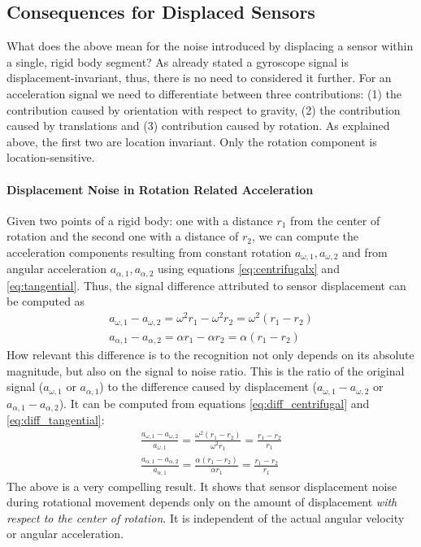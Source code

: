 \subsection{Consequences for Displaced Sensors}
What does the above mean for the noise introduced by displacing a
sensor within a single, rigid body segment?
As already stated a gyroscope signal is displacement-invariant, thus, there is no
need to considered it further. 
For an acceleration signal we need to differentiate between three
contributions: (1) the contribution caused by orientation with respect
to gravity, (2) the contribution caused by translations and  (3)
contribution caused by rotation. As explained above, the first two are
location invariant. Only the rotation component is location-sensitive. 

\paragraph{Displacement Noise in Rotation Related Acceleration}
Given two points of a rigid body: one with a distance $r_1$
from the center of rotation and the second one with a distance of
$r_2$, we can compute the  acceleration components
resulting from constant rotation $a_{\omega,1},a_{\omega,2}$ and from
angular acceleration $a_{\alpha,1},a_{\alpha,2}$ using equations
\ref{eq:centrifugalx} and \ref{eq:tangential}. 
Thus, the signal difference attributed to sensor displacement can be
computed as
\begin{eqnarray}
\label{eq:diff_centrifugal}
a_{\omega,1}-a_{\omega,2}=\omega^2r_1-\omega^2 r_2=\omega^2(r_1-r_2)
\\
\label{eq:diff_tangential}
a_{\alpha,1}-a_{\alpha,2}=\alpha r_1-\alpha  r_2=\alpha(r_1-r_2)
\end{eqnarray} 
How relevant this difference is to the recognition not only depends on its
absolute  magnitude, but also on the signal to noise ratio. This is
the ratio of the original signal ($a_{\omega,1}$ or
$a_{\alpha,1}$) to the difference caused by displacement
($a_{\omega,1}-a_{\omega,2}$ or $a_{\alpha,1}-a_{\alpha,2}$).  It can
be computed from equations \ref{eq:diff_centrifugal} and
\ref{eq:diff_tangential}:
\begin{eqnarray}
\label{eq:diff_centrifugal1}
\frac{a_{\omega,1}-a_{\omega,2}}{a_{\omega,1}}=\frac{\omega^2(r_1-r_2)}{\omega^2
  r_1}=\frac{r_1-r_2}{r_1}
\\
\label{eq:diff_tangential1}
\frac{a_{\alpha,1}-a_{\alpha,2}}{a_{\alpha,1}}=\frac{\alpha(r_1-r_2)}{\alpha
  r_1}=\frac{r_1-r_2}{r_1}
\end{eqnarray}
The above is a very compelling result. It shows that sensor
displacement noise during rotational movement depends only on the amount of
displacement {\em with respect to the center of rotation}. It is
independent of the actual angular velocity or angular acceleration.  


